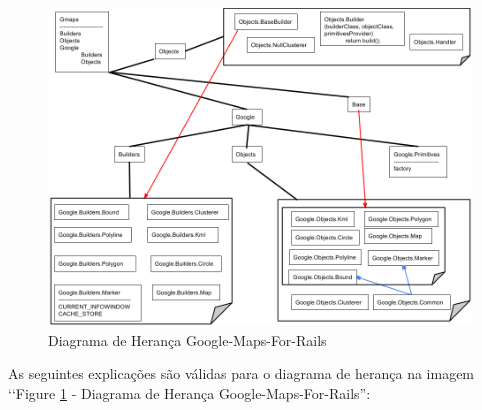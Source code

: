 \begin{figure}[ht]
  \includegraphics[scale=0.48]{images/diagrama_de_heranca_google_maps_for_rails.png}
  \caption{Diagrama de Herança Google-Maps-For-Rails}
  \label{fig:diagrama_de_heranca_google_maps_for_rails}
\end{figure}

As seguintes explicações são válidas para o diagrama de herança na imagem ‘‘Figure 
\ref{fig:diagrama_de_heranca_google_maps_for_rails} - Diagrama de Herança Google-Maps-For-Rails'':

